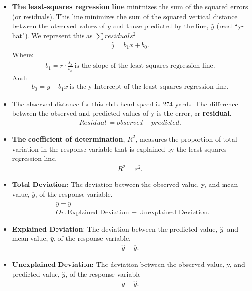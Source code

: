 \documentclass{report}
\begin{document}
\begin{itemize}
        \item \textbf{The least-squares regression line} minimizes the sum of the squared errors (or residuals). This line minimizes the sum of the squared vertical distance between the observed values of $y$  and those predicted by the line, $\hat{y}$  (read “y-hat"). We represent this as $\sum residuals^{2}$
            \begin{align*}
               \hat{y} = b_{1}x + b_{0} 
            .\end{align*}
            Where:
            \begin{align*}
                b_{1} = r \cdot \frac{s_{y}}{s_{x}}\ \text{is the slope of the least-squares regression line}
            .\end{align*}
            And:
            \begin{align*}
                b_{0} = \overline{y} -b_{1}\overline{x}\ \text{is the y-Intercept of the least-squares regression line} 
            .\end{align*}
        \item The observed distance for this club-head speed is 274 yards. The difference between the observed and predicted values of y is the error, or \textbf{residual}.
            \begin{align*}
                Residual\ = observed - predicted
            .\end{align*}
        \item \textbf{The coefficient of determination}, $R^{2}$, measures the proportion of total variation in the response variable that is explained by the least-squares regression line.
            \begin{align*}
                R^{2} = r^{2}
            .\end{align*}

        \item \textbf{Total Deviation:} The deviation between the observed value, y, and mean value, $\overline{y} $, of the response variable.
            \begin{align*}
                &y - \overline{y} \\
                &Or: \text{Explained Deviation + Unexplained Deviation}
            .\end{align*}
        \item \textbf{Explained Deviation:} The deviation between the predicted value, $\hat{y} $, and mean value, $\overline{y} $, of the response variable.
            \begin{align*}
                \hat{y}-\overline{y}
            .\end{align*}
        \item \textbf{Unexplained Deviation:} The deviation between the observed value, y, and predicted value, $\hat{y} $, of the response variable
            \begin{align*}
                y - \hat{y}
            .\end{align*}


\end{itemize}
\end{document}
